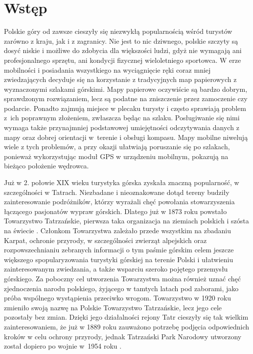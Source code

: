 \section{Wstęp}

Polskie góry od zawsze cieszyły się niezwykłą popularnością wśród turystów zarówno z kraju, jak i z zagranicy. Nie jest to nic dziwnego, polskie szczyty są dosyć niskie i możliwe do zdobycia dla większości ludzi, gdyż nie wymagają ani profesjonalnego sprzętu, ani kondycji fizycznej wieloletniego sportowca.
W erze mobilności i posiadania wszystkiego na wyciągnięcie ręki coraz mniej zwiedzających decyduje się na korzystanie z tradycyjnych map papierowych z wyznaczonymi szlakami górskimi. Mapy papierowe oczywiście są bardzo dobrym, sprawdzonym rozwiązaniem, lecz są podatne na zniszczenie przez zamoczenie czy podarcie. Ponadto zajmują miejsce w plecaku turysty i często sprawiają problem z~ich poprawnym złożeniem, zwłaszcza będąc na szlaku. Posługiwanie się nimi wymaga także przynajmniej podstawowej umiejętności odczytywania danych z mapy oraz dobrej orientacji w~terenie i obsługi kompasu. Mapy mobilne niwelują wiele z tych problemów, a przy okazji ułatwiają poruszanie się po szlakach, ponieważ wykorzystując moduł GPS w urządzeniu mobilnym, pokazują na bieżąco położenie wędrowca.

Już w 2. połowie XIX wieku turystyka górska zyskała znaczną popularność, w szczególności w Tatrach. Niezbadane i nieoznakowane dotąd tereny budziły zainteresowanie podróżników, którzy wyrażali chęć powołania stowarzyszenia łączącego pasjonatów wypraw górskich. Dlatego już w 1873 roku powstało Towarzystwo Tatrzańskie, pierwsza taka organizacja na ziemiach polskich i szósta na świecie \cite{ptt}. Członkom Towarzystwa zależało przede wszystkim na zbadaniu Karpat, ochronie przyrody, w szczególności zwierząt alpejskich oraz rozpowszechnianiu zebranych informacji o tym paśmie górskim celem jeszcze większego spopularyzowania turystyki górskiej na terenie Polski i ułatwieniu zainteresowanym zwiedzania, a także wsparciu szeroko pojętego przemysłu górskiego. Za poboczny cel utworzenia Towarzystwa można również uznać chęć zjednoczenia narodu polskiego, żyjącego w tamtych latach pod zaborami, jako próba wspólnego wystąpienia przeciwko wrogom. Towarzystwo w 1920 roku zmieniło swoją nazwę na Polskie Towarzystwo Tatrzańskie, lecz jego cele pozostały bez zmian. Dzięki jego działalności rejony Tatr cieszyły się tak wielkim zainteresowaniem, że już w 1889 roku zauważono potrzebę podjęcia odpowiednich kroków w celu ochrony przyrody, jednak Tatrzański Park Narodowy utworzony został dopiero po wojnie w~1954 roku \cite{tpn}.

